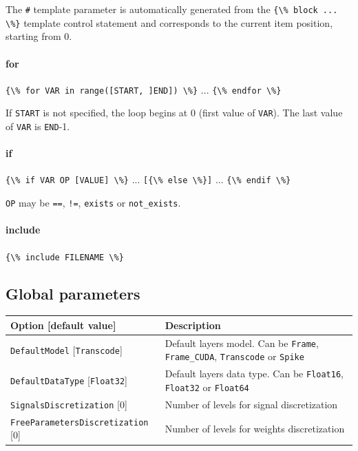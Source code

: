 \documentclass[a4paper,11pt,oneside]{article}
\begin{document}
The \lstinline!#! template parameter is automatically generated from the
\lstinline!{\% block ... \%}! template control statement and corresponds to the
current item position, starting from 0.

\paragraph{for}
\lstinline!{\% for VAR in range([START, ]END]) \%}! ...
\lstinline!{\% endfor \%}!

If \lstinline!START! is not specified, the loop begins at 0 (first value of
\lstinline!VAR!). The last value of \lstinline!VAR! is \lstinline!END!-1.

\paragraph{if}
\lstinline!{\% if VAR OP [VALUE] \%}! ...
\lstinline![{\% else \%}]! ...
\lstinline!{\% endif \%}!

\lstinline!OP! may be \lstinline!==!, \lstinline?!=?, \lstinline!exists! or \lstinline!not_exists!.

\paragraph{include}
\lstinline!{\% include FILENAME \%}!


\subsection{Global parameters}

\begin{center}
 \begin{tabular}{| p{5cm} | p{10cm} | }
 \hline
 Option [default value] & Description\\
 \hline\hline
  \lstinline!DefaultModel! [\lstinline!Transcode!] & Default layers model.
  Can be \lstinline!Frame!, \lstinline!Frame_CUDA!, \lstinline!Transcode!
  or \lstinline!Spike! \\
  \lstinline!DefaultDataType! [\lstinline!Float32!] & Default layers data type.
  Can be \lstinline!Float16!, \lstinline!Float32! or \lstinline!Float64! \\
  \lstinline!SignalsDiscretization! [0] & Number of levels for signal
  discretization \\
  \lstinline!FreeParametersDiscretization! [0] & Number of levels for weights discretization \\
 \hline
\end{tabular}
\end{center}
\end{document}

